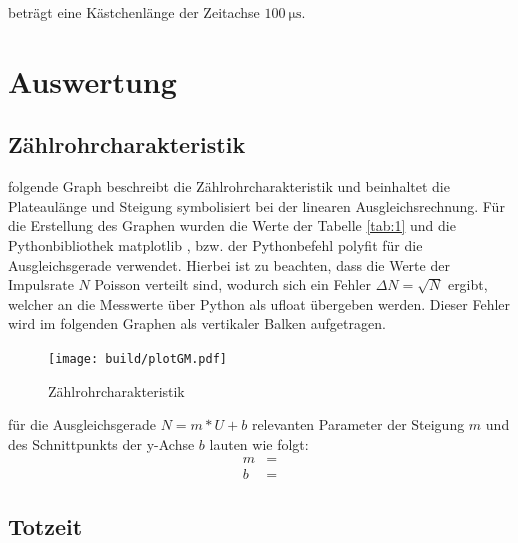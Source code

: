     \justifying beträgt eine Kästchenlänge der Zeitachse $\SI{100}{\micro\second}$. 

\newpage
\section{Auswertung}

    \subsection{Zählrohrcharakteristik}

    \justifying folgende Graph beschreibt die Zählrohrcharakteristik und beinhaltet die Plateaulänge und Steigung
    symbolisiert bei der linearen Ausgleichsrechnung. Für die Erstellung des Graphen wurden die Werte der Tabelle \ref{tab:1} und 
    die Pythonbibliothek matplotlib \cite{matplotlib}, bzw. der Pythonbefehl polyfit \cite{numpy} für die Ausgleichsgerade verwendet. 
    Hierbei ist zu beachten, dass die Werte der Impulsrate $N$ Poisson verteilt sind, wodurch sich ein Fehler $\Delta N = \sqrt{N}$ 
    ergibt, welcher an die Messwerte über Python als ufloat \cite{uncertainties} übergeben werden. Dieser Fehler wird im folgenden 
    Graphen als vertikaler Balken aufgetragen.

    \begin{figure}[H]
        \centering
        \texttt{[image: build/plotGM.pdf]}
        \caption{Zählrohrcharakteristik}
        \label{fig:7}
    \end{figure}

    \justifying für die Ausgleichsgerade $N = m*U+b$ relevanten Parameter der Steigung $m$ und des Schnittpunkts der y-Achse 
    $b$ lauten wie folgt:
    \begin{align}
        m &= \text{}\\
        b &= \text{}
    \end{align}

    \subsection{Totzeit}

